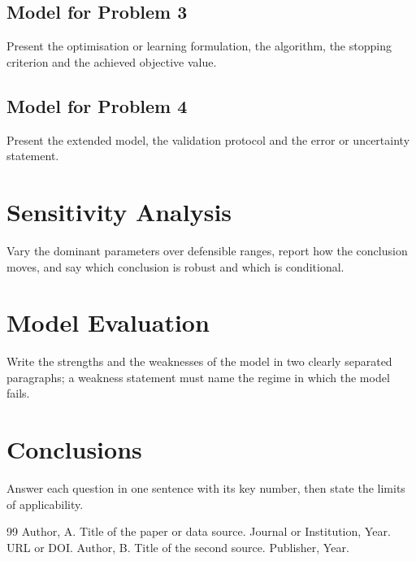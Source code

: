 \documentclass[12pt,letterpaper]{article}
\newcommand{\bibfont}{\fontsize{10.5pt}{14pt}\selectfont}
\begin{document}
\subsection{Model for Problem 3}
Present the optimisation or learning formulation, the algorithm, the stopping criterion and the achieved objective value.

\subsection{Model for Problem 4}
Present the extended model, the validation protocol and the error or uncertainty statement.

\section{Sensitivity Analysis}
Vary the dominant parameters over defensible ranges, report how the conclusion moves, and say which conclusion is robust and which is conditional.

\section{Model Evaluation}
Write the strengths and the weaknesses of the model in two clearly separated paragraphs; a weakness statement must name the regime in which the model fails.

\section{Conclusions}
Answer each question in one sentence with its key number, then state the limits of applicability.

\begin{thebibliography}{99}
\bibfont
{} Author, A. Title of the paper or data source. Journal or Institution, Year. URL or DOI.
 Author, B. Title of the second source. Publisher, Year.
\end{thebibliography}
\label{body:end}
\end{document}
